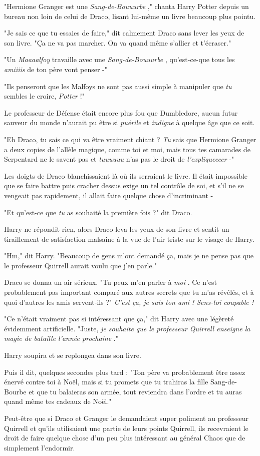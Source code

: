"Hermione Granger est une \emph{Sang-de-Bouuurbe} ," chanta Harry Potter depuis un bureau non loin de celui de Draco, lisant lui-même un livre beaucoup plus pointu.

"Je sais ce que tu essaies de faire," dit calmement Draco sans lever les yeux de son livre. "Ça ne va pas marcher. On va quand même s'allier et t'écraser."

"Un \emph{Maaaalfoy}  travaille avec une \emph{Sang-de-Bouuurbe} , qu'est-ce-que tous les \emph{amiiiis } de ton père vont penser -"

"Ils penseront que les Malfoys ne sont pas aussi simple à manipuler que \emph{tu}  sembles le croire, \emph{Potter}  !"

Le professeur de Défense était encore plus fou que Dumbledore, aucun futur sauveur du monde n'aurait pu être si \emph{puérile}  et \emph{indigne}  à quelque âge que ce soit.

"Eh Draco, tu sais ce qui va être vraiment chiant ? \emph{Tu } sais que Hermione Granger a deux copies de l'allèle magique, comme toi et moi, mais tous tes camarades de Serpentard ne le savent pas et \emph{tuuuuuu } n'as pas le droit de \emph{l'expliqueeeer}  -"

Les doigts de Draco blanchissaient là où ils serraient le livre. Il était impossible que se faire battre puis cracher dessus exige un tel contrôle de soi, et s'il ne se vengeait pas rapidement, il allait faire quelque chose d'incriminant -

"Et qu'est-ce que \emph{tu}  as souhaité la première fois ?" dit Draco.

Harry ne répondit rien, alors Draco leva les yeux de son livre et sentit un tiraillement de satisfaction malsaine à la vue de l'air triste sur le visage de Harry.

"Hm," dit Harry. "Beaucoup de gens m'ont demandé ça, mais je ne pense pas que le professeur Quirrell aurait voulu que j'en parle."

Draco se donna un air sérieux. "Tu peux m'en parler à \emph{moi} . Ce n'est probablement pas important comparé aux autres secrets que tu m'as révélés, et à quoi d'autres les amis servent-ils ?" \emph{C'est ça, je suis ton ami ! Sens-toi coupable !} 

"Ce n'était vraiment pas si intéressant que ça," dit Harry avec une légèreté évidemment artificielle. "Juste, \emph{je souhaite que le professeur Quirrell enseigne la magie de bataille l'année prochaine} ."

Harry soupira et se replongea dans son livre.

Puis il dit, quelques secondes plus tard : "Ton père va probablement être assez énervé contre toi à Noël, mais si tu promets que tu trahiras la fille Sang-de-Bourbe et que tu balaieras son armée, tout reviendra dans l'ordre et tu auras quand même tes cadeaux de Noël."

Peut-être que si Draco et Granger le demandaient super poliment au professeur Quirrell et qu'ils utilisaient une partie de leurs points Quirrell, ils recevraient le droit de faire quelque chose d'un peu plus intéressant au général Chaos que de simplement l'endormir.

